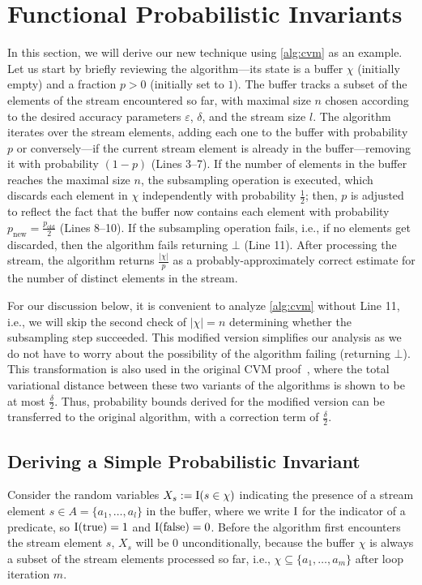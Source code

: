 \section{Functional Probabilistic Invariants}\label{sec:invariants}
In this section, we will derive our new technique using \cref{alg:cvm} as an example.
Let us start by briefly reviewing the algorithm---its state is a buffer $\chi$ (initially empty) and a fraction $p > 0$ (initially set to $1$).
The buffer tracks a subset of the elements of the stream encountered so far, with maximal size $n$ chosen according to the desired accuracy parameters $\varepsilon$, $\delta$, and the stream size $l$.
The algorithm iterates over the stream elements, adding each one to the buffer with probability $p$ or conversely---if the current stream element is already in the buffer---removing it with probability $(1-p)$ (Lines 3--7).
If the number of elements in the buffer reaches the maximal size $n$, the subsampling operation is executed, which discards each element in $\chi$ independently with probability $\frac{1}{2}$; then, $p$ is adjusted to reflect the fact that the buffer now contains each element with probability $p_\text{new} = \frac{p_\text{old}}{2}$ (Lines 8--10).
If the subsampling operation fails, i.e., if no elements get discarded, then the algorithm fails returning $\bot$ (Line 11).
After processing the stream, the algorithm returns $\frac{|\chi|}{p}$ as a probably-approximately correct estimate for the number of distinct elements in the stream.

\begin{remark}
For our discussion below, it is convenient to analyze \cref{alg:cvm} without Line 11, i.e., we will skip the second check of $|\chi|=n$ determining whether the subsampling step succeeded.
This modified version simplifies our analysis as we do not have to worry about the possibility of the algorithm failing (returning $\bot$).
This transformation is also used in the original CVM proof~\cite{chakraborty2023}, where the total variational distance between these two variants of the algorithms is shown to be at most $\frac{\delta}{2}$.
Thus, probability bounds derived for the modified version can be transferred to the original algorithm, with a correction term of $\frac{\delta}{2}$.
\lipicsEnd\end{remark}

\subsection{Deriving a Simple Probabilistic Invariant}
Consider the random variables $X_s := \operatorname{\mathrm{I}}(s \in \chi)$ indicating the presence of a stream element $s \in A = \{a_1,\ldots,a_l\}$ in the buffer, where we write $\operatorname{\mathrm{I}}$ for the indicator of a predicate, so $\operatorname{\mathrm{I}}(\mathrm{true}) = 1$ and $\operatorname{\mathrm{I}}(\mathrm{false}) = 0$.
Before the algorithm first encounters the stream element $s$, $X_s$ will be $0$ unconditionally, because the buffer $\chi$ is always a subset of the stream elements processed so far, i.e., $\chi \subseteq \{a_1,\dots,a_m\}$ after loop iteration $m$.

